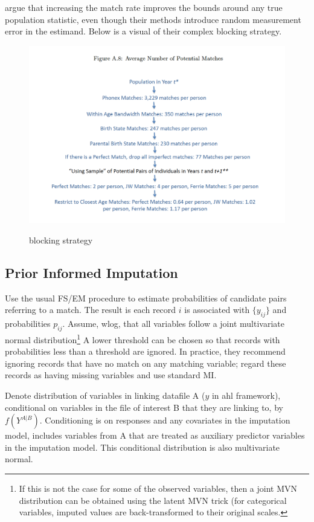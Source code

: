\documentclass[12pt]{article}
\begin{document}
\cite{nq2015} argue that increasing the match rate improves the bounds around any true population statistic, even though their methods introduce random measurement error in the estimand.  Below is a visual of their complex blocking strategy.

\begin{figure}[htbp]
\begin{center}
\caption{\cite{nq2015} blocking strategy}
\includegraphics[width=\textwidth]{nq_method.png}
\label{default}
\end{center}
\end{figure}

\subsection{Prior Informed Imputation \citep{Goldstein2012}}

Use the usual FS/EM procedure to estimate probabilities of candidate pairs referring to a match.  The result is each record $i$ is associated with $\{y_{ij}\}$ and probabilities $p_{ij}$.  Assume, wlog, that all variables follow a joint multivariate normal distribution\footnote{If this is not the case for some of the observed variables, then a joint MVN distribution can be obtained using the latent MVN trick (for categorical variables, imputed values are back-transformed to their original scales.} A lower threshold can be chosen so that records with probabilities less than a threshold are ignored.  In practice, they recommend ignoring records that have no match on any matching variable; regard these records as having missing variables and use standard MI.

Denote distribution of variables in linking datafile A ($y$ in ahl framework), conditional on variables in the file of interest B that they are linking to, by $f(Y^{A|B})$.   Conditioning is on responses and any covariates in the imputation model, includes variables from A that are treated as auxiliary predictor variables in the imputation model.  This conditional distribution is also multivariate normal.  
\end{document}
